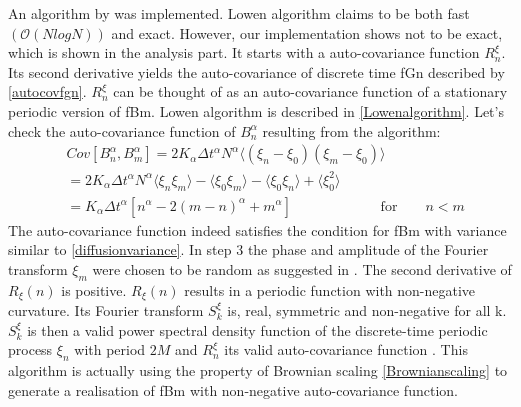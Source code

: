 \documentclass[
  a4paper,BCOR10mm,twoside,
  headsepline,footsepline,%
  fleqn,openbib
]{scrbook}
\begin{document}
 An algorithm by \citet{Lowen1999} was implemented. Lowen algorithm claims to be both fast $(\mathcal{O}(NlogN))$ and exact. However, our implementation shows not to be exact, which is shown in the analysis part. It starts with a auto-covariance function $R^{\xi}_n$. Its second derivative yields the auto-covariance of discrete time fGn described by \cref{autocovfgn}. $R^{\xi}_n$ can be thought of as an auto-covariance function of a stationary periodic version of fBm. Lowen algorithm is described in \cref{Lowenalgorithm}. Let's check the auto-covariance function of $B^{\alpha}_n$ resulting from the algorithm: 
\begin{align}
  & Cov[B^{\alpha}_n,B^{\alpha}_m]= 2 K_{\alpha} \Delta t^{\alpha} N^{\alpha} \langle (\xi_n- \xi_0) (\xi_m- \xi_0)\rangle \\
 &=  2 K_{\alpha} \Delta t^{\alpha} N^{\alpha}\langle\xi_n \xi_m\rangle -\langle \xi_0 \xi_m \rangle - \langle \xi_0 \xi_n\rangle +\langle \xi_0^2\rangle \\ 
 &= K_{\alpha} \Delta t^{\alpha}[n^{\alpha}-2(m-n)^{\alpha}+m^{\alpha}]\qquad \qquad \qquad \text{ for} \qquad n < m
\end{align}
The auto-covariance function indeed satisfies the condition for fBm with variance similar to \cref{diffusionvariance}. In step 3 the phase and amplitude of the Fourier transform  $\xi_m$ were chosen to be random  as suggested in \cite{Timmer1995}. The second derivative of $R_{\xi}(n) $ is positive. $R_{\xi}(n) $ results in a periodic function with non-negative curvature. Its Fourier transform $S^{\xi}_k$ is, real, symmetric  and non-negative for all k. $S^{\xi}_k$ is then a valid power spectral density function of the discrete-time periodic process $\xi_n$ with period $2M$ and  $R^{\xi}_n$ its valid auto-covariance function \cite{Lowen1999}. This algorithm is actually using the property of Brownian scaling \cref{Brownianscaling} to generate a realisation of fBm  with non-negative auto-covariance function. 
\end{document}
